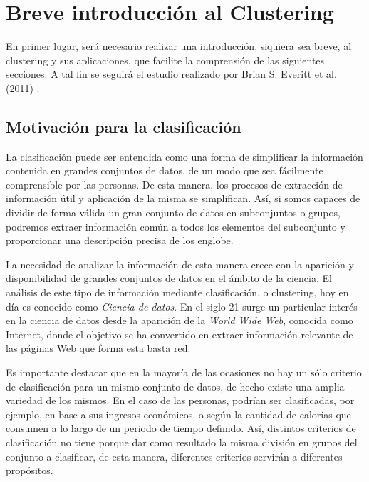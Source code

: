 
\chapter{Breve introducción al Clustering}\label{ch:Breve introducción al Clustering}

En primer lugar, será necesario realizar una introducción, siquiera sea breve, al clustering y sus aplicaciones, que facilite la comprensión de las siguientes secciones. A tal fin se seguirá el estudio realizado por Brian S. Everitt et al. (2011) \cite{ClusterAnalysis}.

\section{Motivación para la clasificación}

La clasificación puede ser entendida como una forma de simplificar la información contenida en grandes conjuntos de datos, de un modo que sea fácilmente comprensible por las personas. De esta manera, los procesos de extracción de información útil y aplicación de la misma se simplifican. Así, si somos capaces de dividir de forma válida un gran conjunto de datos en subconjuntos o grupos, podremos extraer información común a todos los elementos del subconjunto y proporcionar una descripción precisa de los englobe.

La necesidad de analizar la información de esta manera crece con la aparición y disponibilidad de grandes conjuntos de datos en el ámbito de la ciencia. El análisis de este tipo de información mediante clasificación, o clustering, hoy en día es conocido como \textit{Ciencia de datos}. En el siglo 21 surge un particular interés en la ciencia de datos desde la aparición de la \textit{World Wide Web}, conocida como Internet, donde el objetivo se ha convertido en extraer información relevante de las páginas Web que forma esta basta red.

Es importante destacar que en la mayoría de las ocasiones no hay un sólo criterio de clasificación para un mismo conjunto de datos, de hecho existe una amplia variedad de los mismos. En el caso de las personas, podrían ser clasificadas, por ejemplo, en base a sus ingresos económicos, o según la cantidad de calorías que consumen a lo largo de un periodo de tiempo definido. Así, distintos criterios de clasificación no tiene porque dar como resultado la misma división en grupos del conjunto a clasificar, de esta manera, diferentes criterios servirán a diferentes propósitos.

